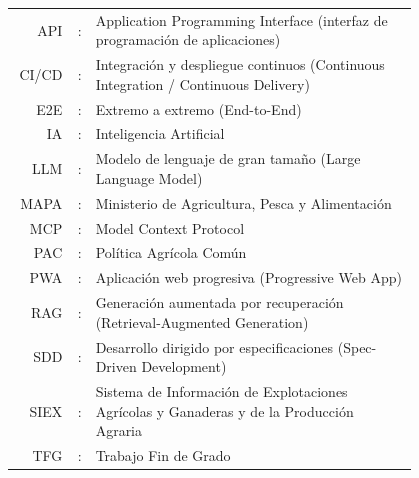 \firma %



\begin{tabular}{r r p{0.8\linewidth}}
API  & : & Application Programming Interface (interfaz de programación de aplicaciones) \\
CI/CD& : & Integración y despliegue continuos (Continuous Integration / Continuous Delivery) \\
E2E  & : & Extremo a extremo (End-to-End) \\
IA   & : & Inteligencia Artificial \\
LLM  & : & Modelo de lenguaje de gran tamaño (Large Language Model) \\
MAPA & : & Ministerio de Agricultura, Pesca y Alimentación \\
MCP  & : & Model Context Protocol \\
PAC  & : & Política Agrícola Común \\
PWA  & : & Aplicación web progresiva (Progressive Web App) \\
RAG  & : & Generación aumentada por recuperación (Retrieval-Augmented Generation) \\
SDD  & : & Desarrollo dirigido por especificaciones (Spec-Driven Development) \\
SIEX & : & Sistema de Información de Explotaciones Agrícolas y Ganaderas y de la Producción Agraria \\
TFG  & : & Trabajo Fin de Grado
\end{tabular}


\idxGral
\idxFiguras
\idxTablas
\idxListados
